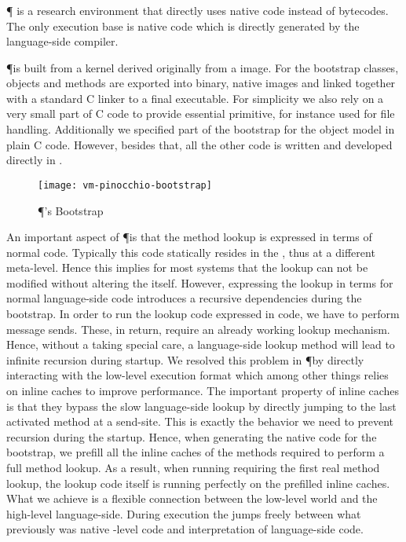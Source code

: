 \subsubsection*{\Pinocchio \VM}

\P \cite{Verw11a} is a research \ST environment that directly uses native code instead of bytecodes.
The only execution base is native code which is directly generated by the language-side compiler.

\P is built from a kernel derived originally from a \PH image.
For the bootstrap classes, objects and methods are exported into binary, native images and linked together with a standard C linker to a final executable.
For simplicity we also rely on a very small part of C code to provide essential primitive, for instance used for file handling.
Additionally we specified part of the bootstrap for the \ST object model in plain C code.
However, besides that, all the other code is written and developed directly in \ST.
%
\begin{figure}[h]
	\centering
	\texttt{[image: vm-pinocchio-bootstrap]}
	\caption{\P's Bootstrap}
\end{figure}

An important aspect of \P is that the method lookup is expressed in terms of normal \ST code.
Typically this code statically resides in the \VM, thus at a different meta-level.
Hence this implies for most systems that the lookup can not be modified without altering the \VM itself.
However, expressing the lookup in terms for normal language-side code introduces a recursive dependencies during the bootstrap.
In order to run the lookup code expressed in \ST code, we have to perform message sends.
These, in return, require an already working lookup mechanism.
Hence, without a taking special care, a language-side lookup method will lead to infinite recursion during startup.
We resolved this problem in \P by directly interacting with the low-level execution format which among other things relies on inline caches to improve performance.
The important property of inline caches is that they bypass the slow language-side lookup by directly jumping to the last activated method at a send-site.
This is exactly the behavior we need to prevent recursion during the startup.
Hence, when generating the native code for the bootstrap, we prefill all the inline caches of the methods required to perform a full method lookup.
As a result, when running requiring the first real method lookup, the lookup code itself is running perfectly on the prefilled inline caches.
What we achieve is a flexible connection between the low-level world and the high-level language-side.
During execution the \VM jumps freely between what previously was native \VM-level code and interpretation of language-side code.

